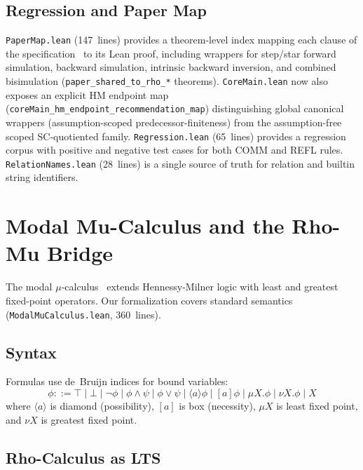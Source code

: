 \documentclass[11pt]{article}
\theoremstyle{definition}
\theoremstyle{remark}
\begin{document}
\subsection{Regression and Paper Map}

\texttt{PaperMap.lean} (147~lines) provides a theorem-level index mapping
each clause of the specification~\cite{MeredithMeTTaCalculus2024} to its
Lean proof, including wrappers for step/star forward simulation, backward
simulation, intrinsic backward inversion, and combined bisimulation
(\texttt{paper\_shared\_to\_rho\_*} theorems).
\texttt{CoreMain.lean} now also exposes an explicit HM endpoint map
(\texttt{coreMain\_hm\_endpoint\_recommendation\_map}) distinguishing global
canonical wrappers (assumption-scoped predecessor-finiteness) from the
assumption-free scoped SC-quotiented family.
\texttt{Regression.lean} (65~lines) provides a regression corpus with
positive and negative test cases for both COMM and REFL rules.
\texttt{RelationNames.lean} (28~lines) is a single source of truth for
relation and builtin string identifiers.


\section{Modal Mu-Calculus and the Rho-Mu Bridge}
\label{sec:mu-bridge}

The modal $\mu$-calculus~\cite{Kozen1983,BradfieldStirling2007} extends
Hennessy-Milner logic with least and greatest fixed-point operators.
Our formalization covers standard semantics
(\texttt{ModalMuCalculus.lean}, 360~lines).

\subsection{Syntax}

Formulas use de~Bruijn indices for bound variables:
\[
  \phi ::= \top \mid \bot \mid \neg \phi \mid \phi \land \psi \mid
           \phi \lor \psi \mid \langle a \rangle \phi \mid [a] \phi
           \mid \mu X.\phi \mid \nu X.\phi \mid X
\]
where $\langle a \rangle$ is diamond (possibility), $[a]$ is box
(necessity), $\mu X$ is least fixed point, and $\nu X$ is greatest
fixed point.

\subsection{Rho-Calculus as LTS}
\end{document}
